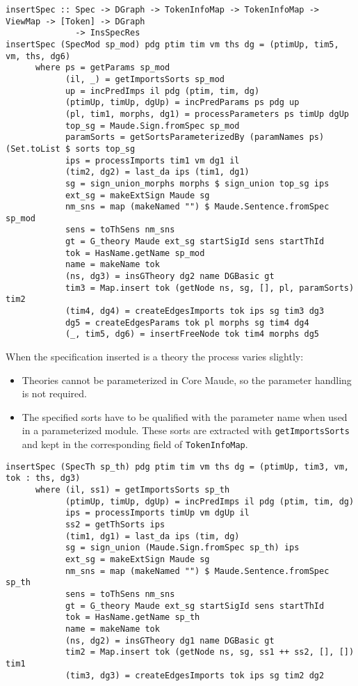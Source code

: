 {\codesize
\begin{verbatim}
insertSpec :: Spec -> DGraph -> TokenInfoMap -> TokenInfoMap -> ViewMap -> [Token] -> DGraph
              -> InsSpecRes
insertSpec (SpecMod sp_mod) pdg ptim tim vm ths dg = (ptimUp, tim5, vm, ths, dg6)
      where ps = getParams sp_mod
            (il, _) = getImportsSorts sp_mod
            up = incPredImps il pdg (ptim, tim, dg)
            (ptimUp, timUp, dgUp) = incPredParams ps pdg up
            (pl, tim1, morphs, dg1) = processParameters ps timUp dgUp
            top_sg = Maude.Sign.fromSpec sp_mod
            paramSorts = getSortsParameterizedBy (paramNames ps) (Set.toList $ sorts top_sg
            ips = processImports tim1 vm dg1 il
            (tim2, dg2) = last_da ips (tim1, dg1)
            sg = sign_union_morphs morphs $ sign_union top_sg ips
            ext_sg = makeExtSign Maude sg
            nm_sns = map (makeNamed "") $ Maude.Sentence.fromSpec sp_mod
            sens = toThSens nm_sns
            gt = G_theory Maude ext_sg startSigId sens startThId
            tok = HasName.getName sp_mod
            name = makeName tok
            (ns, dg3) = insGTheory dg2 name DGBasic gt
            tim3 = Map.insert tok (getNode ns, sg, [], pl, paramSorts) tim2
            (tim4, dg4) = createEdgesImports tok ips sg tim3 dg3
            dg5 = createEdgesParams tok pl morphs sg tim4 dg4
            (_, tim5, dg6) = insertFreeNode tok tim4 morphs dg5
\end{verbatim}
}

When the specification inserted is a theory the process varies slightly:

\begin{itemize}
\item Theories cannot be parameterized in Core Maude, so the parameter
handling is not required.
\item The specified sorts have to be qualified with the parameter
name when used in a parameterized module. These sorts are extracted
with \verb"getImportsSorts" and kept in the corresponding field of
\verb"TokenInfoMap".
\end{itemize}

{\codesize
\begin{verbatim}
insertSpec (SpecTh sp_th) pdg ptim tim vm ths dg = (ptimUp, tim3, vm, tok : ths, dg3)
      where (il, ss1) = getImportsSorts sp_th
            (ptimUp, timUp, dgUp) = incPredImps il pdg (ptim, tim, dg)
            ips = processImports timUp vm dgUp il
            ss2 = getThSorts ips
            (tim1, dg1) = last_da ips (tim, dg)
            sg = sign_union (Maude.Sign.fromSpec sp_th) ips
            ext_sg = makeExtSign Maude sg
            nm_sns = map (makeNamed "") $ Maude.Sentence.fromSpec sp_th
            sens = toThSens nm_sns
            gt = G_theory Maude ext_sg startSigId sens startThId
            tok = HasName.getName sp_th
            name = makeName tok
            (ns, dg2) = insGTheory dg1 name DGBasic gt
            tim2 = Map.insert tok (getNode ns, sg, ss1 ++ ss2, [], []) tim1
            (tim3, dg3) = createEdgesImports tok ips sg tim2 dg2
\end{verbatim}
}

